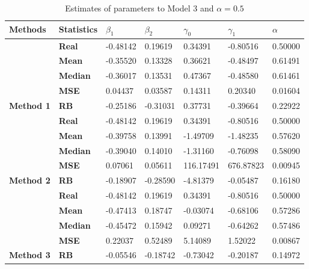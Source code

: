 \begin{table}

\caption{\label{tab:Est_model_3_Alpha0.5}Estimates of parameters to Model 3 and $\alpha=0.5$}
\centering
\begin{tabular}[t]{>{}l>{}llllll}
\toprule
Methods & Statistics & $\beta_1$ & $\beta_2$ & $\gamma_0$ & $\gamma_1$ & $\alpha$\\
\midrule
 & \textbf{Real} & -0.48142 & 0.19619 & 0.34391 & -0.80516 & 0.50000\\
\cmidrule{2-7}
 & \textbf{Mean} & -0.35520 & 0.13328 & 0.36621 & -0.48497 & 0.61491\\
\cmidrule{2-7}
 & \textbf{Median} & -0.36017 & 0.13531 & 0.47367 & -0.48580 & 0.61461\\
\cmidrule{2-7}
 & \textbf{MSE} & 0.04437 & 0.03587 & 0.14311 & 0.20340 & 0.01604\\
\cmidrule{2-7}
\multirow{-5}{*}{\raggedright\arraybackslash \textbf{Method 1}} & \textbf{RB} & -0.25186 & -0.31031 & 0.37731 & -0.39664 & 0.22922\\
\cmidrule{1-7}
 & \textbf{Real} & -0.48142 & 0.19619 & 0.34391 & -0.80516 & 0.50000\\
\cmidrule{2-7}
 & \textbf{Mean} & -0.39758 & 0.13991 & -1.49709 & -1.48235 & 0.57620\\
\cmidrule{2-7}
 & \textbf{Median} & -0.39040 & 0.14010 & -1.31160 & -0.76098 & 0.58090\\
\cmidrule{2-7}
 & \textbf{MSE} & 0.07061 & 0.05611 & 116.17491 & 676.87823 & 0.00945\\
\cmidrule{2-7}
\multirow{-5}{*}{\raggedright\arraybackslash \textbf{Method 2}} & \textbf{RB} & -0.18907 & -0.28590 & -4.81379 & -0.05487 & 0.16180\\
\cmidrule{1-7}
 & \textbf{Real} & -0.48142 & 0.19619 & 0.34391 & -0.80516 & 0.50000\\
\cmidrule{2-7}
 & \textbf{Mean} & -0.47413 & 0.18747 & -0.03074 & -0.68106 & 0.57286\\
\cmidrule{2-7}
 & \textbf{Median} & -0.45472 & 0.15942 & 0.09271 & -0.64262 & 0.57486\\
\cmidrule{2-7}
 & \textbf{MSE} & 0.22037 & 0.52489 & 5.14089 & 1.52022 & 0.00867\\
\cmidrule{2-7}
\multirow{-5}{*}{\raggedright\arraybackslash \textbf{Method 3}} & \textbf{RB} & -0.05546 & -0.18742 & -0.73042 & -0.20187 & 0.14972\\
\bottomrule
\end{tabular}
\end{table}
